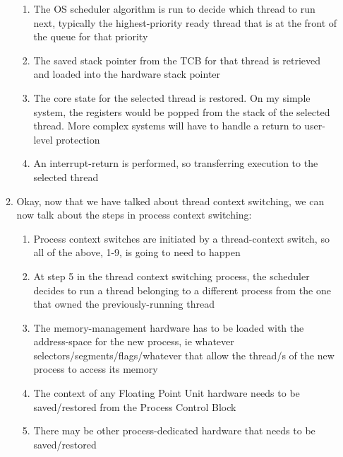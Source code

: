 \documentclass [12pt, executivepaper]{article}
\begin{document}
\begin{enumerate}
\begin{enumerate}
\begin{enumerate}
\item The OS scheduler algorithm is run to decide which thread to run next, typically the highest-priority ready thread that is at the front of the queue for that priority

\item The saved stack pointer from the TCB for that thread is retrieved and loaded into the hardware stack pointer

\item The core state for the selected thread is restored. On my simple system, the registers would be popped from the stack of the selected thread. More complex systems will have to handle a return to user-level protection

\item An interrupt-return is performed, so transferring execution to the selected thread

\end{enumerate}

\item Okay, now that we have talked about thread context switching, we can now talk about the steps in process context switching:

\pagebreak

\vspace*{-40mm}

\begin{enumerate}

\item Process context switches are initiated by a thread-context switch, so all of the above, 1-9, is going to need to happen

\item At step 5 in the thread context switching process, the scheduler decides to run a thread belonging to a different process from the one that owned the previously-running thread

\item The memory-management hardware has to be loaded with the address-space for the new process, ie whatever selectors/segments/flags/whatever that allow the thread/s of the new process to access its memory

\item The context of any Floating Point Unit  hardware needs to be saved/restored from the Process Control Block

\item There may be other process-dedicated hardware that needs to be saved/restored

\end{enumerate}

\end{enumerate}

\end{enumerate}
\end{document}
